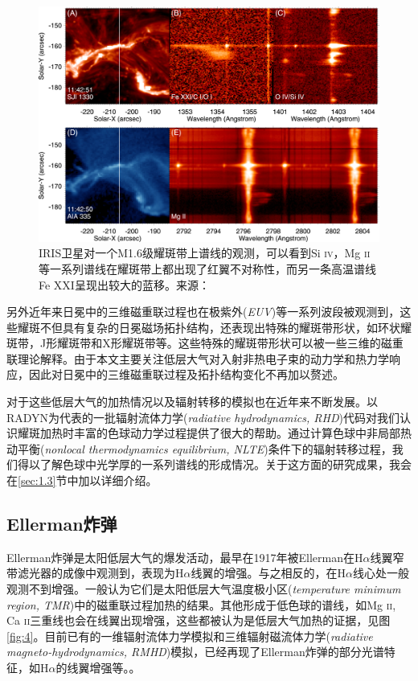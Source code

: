 \begin{figure}
	\centering
	\includegraphics[width=0.7\linewidth]{figs/fig3}
	\caption{IRIS卫星对一个M1.6级耀斑带上谱线的观测，可以看到Si \textsc{iv}，Mg \textsc{ii}等一系列谱线在耀斑带上都出现了红翼不对称性，而另一条高温谱线Fe XXI呈现出较大的蓝移。来源：\textcite{Tian2018}}
	\label{fig:3}
\end{figure}
另外近年来日冕中的三维磁重联过程也在极紫外(\textit{EUV})等一系列波段被观测到，这些耀斑不但具有复杂的日冕磁场拓扑结构，还表现出特殊的耀斑带形状，如环状耀斑带\parencite{Wang2012,Sun2013}，J形耀斑带\parencite{Chandra2009}和X形耀斑带\parencite{Liu2016}等。这些特殊的耀斑带形状可以被一些三维的磁重联理论解释\parencite{Janvier2013,Janvier2014}。由于本文主要关注低层大气对入射非热电子束的动力学和热力学响应，因此对日冕中的三维磁重联过程及拓扑结构变化不再加以赘述。

对于这些低层大气的加热情况以及辐射转移的模拟也在近年来不断发展。以RADYN\parencite{Carlsson1992,Carlsson1997,Allred2005,Allred2015}为代表的一批辐射流体力学(\textit{radiative hydrodynamics, RHD})代码对我们认识耀斑加热时丰富的色球动力学过程提供了很大的帮助。通过计算色球中非局部热动平衡(\textit{nonlocal thermodynamics equilibrium, NLTE})条件下的辐射转移过程，我们得以了解色球中光学厚的一系列谱线的形成情况。关于这方面的研究成果，我会在\ref{sec:1.3}节中加以详细介绍。

\subsection{Ellerman炸弹}
Ellerman炸弹是太阳低层大气的爆发活动，最早在1917年被Ellerman在H$\alpha$线翼窄带滤光器的成像中观测到\parencite{Ellerman1917}，表现为H$\alpha$线翼的增强\parencite{Georgoulis2002,Yang2003,Fang2006,Pariat2007,Nelson2013,Nelson2015,Vissers2015}。与之相反的，在H$\alpha$线心处一般观测不到增强。一般认为它们是太阳低层大气温度极小区(\textit{temperature minimum region, TMR})中的磁重联过程加热的结果\parencite{Reid2015,Rouppe2016,Ni2016}。其他形成于低色球的谱线，如Mg \textsc{ii}, Ca \textsc{ii}三重线也会在线翼出现增强，这些都被认为是低层大气加热的证据\parencite{Hong2017a,Nelson2017,Chen2017a}，见图\ref{fig:4}。目前已有的一维辐射流体力学模拟和三维辐射磁流体力学(\textit{radiative magneto-hydrodynamics, RMHD})模拟，已经再现了Ellerman炸弹的部分光谱特征，如H$\alpha$的线翼增强等。\parencite{Hong2017a,Reid2017,Hansteen2017,Danilovic2017,Hansteen2019}。

